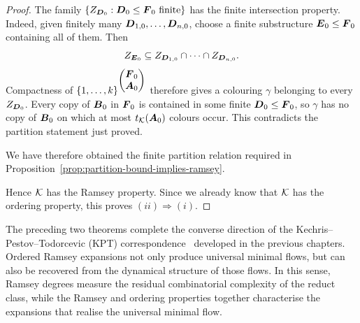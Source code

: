 \begin{proof}
    The family \(\{Z_{\boldsymbol{D}_0}:\boldsymbol{D}_0\leq\boldsymbol{F}_0\text{ finite}\}\) has the finite
    intersection property. Indeed, given finitely many
    \(\boldsymbol{D}_{1,0},\dots,\boldsymbol{D}_{n,0}\), choose a finite substructure
    \(\boldsymbol{E}_0\leq\boldsymbol{F}_0\) containing all of them. Then
    \[
        Z_{\boldsymbol{E}_0}\subseteq
        Z_{\boldsymbol{D}_{1,0}}\cap\cdots\cap Z_{\boldsymbol{D}_{n,0}}.
    \]
    Compactness of
    \(\{1,\dots,k\}^{\begin{pmatrix}\boldsymbol{F}_0\\ \boldsymbol{A}_0\end{pmatrix}}\) therefore
    gives a colouring \(\gamma\) belonging to every \(Z_{\boldsymbol{D}_0}\). Every copy
    of \(\boldsymbol{B}_0\) in \(\boldsymbol{F}_0\) is contained in some finite
    \(\boldsymbol{D}_0\leq\boldsymbol{F}_0\), so \(\gamma\) has no copy of \(\boldsymbol{B}_0\) on which at
    most \(t_{\mathcal{K}}(\boldsymbol{A}_0)\) colours occur. This contradicts the partition
    statement just proved.

    We have therefore obtained the finite partition relation required in
    Proposition~\ref{prop:partition-bound-implies-ramsey}.

    Hence \(\mathcal{K}\) has the Ramsey property. Since we already know that \(\mathcal{K}\) has the ordering property, this proves \((ii)\Rightarrow(i)\).
\end{proof}

The preceding two theorems complete the converse direction of the Kechris--Pestov--Todorcevic (KPT) correspondence~\cite{KPT05} developed in the previous chapters. Ordered Ramsey expansions not only produce universal minimal flows, but can also be recovered from the dynamical structure of those flows. In this sense, Ramsey degrees measure the residual combinatorial complexity of the reduct class, while the Ramsey and ordering properties together characterise the expansions that realise the universal minimal flow.
